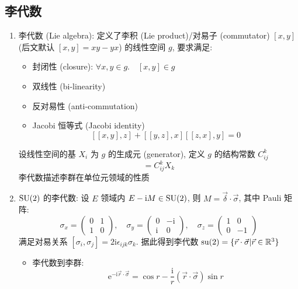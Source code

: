 \documentclass[12pt,a4paper]{article}%
\numberwithin{equation}{section}%
\newcommand\mi{\mathrm{i}}
\newcommand\e{\mathrm{e}}%
\begin{document}
\subsection{李代数} %
\label{sub:lie_alg}
\begin{enumerate}
	\item 李代数 (Lie algebra): 定义了李积 (Lie product)/对易子 (commutator) $[x,y]$ (后文默认 $[x,y] = xy-yx$) 的线性空间 $g$, 要求满足:
	\begin{itemize}
		\item 封闭性 (closure): $\forall x,y\in g.\quad [x,y]\in g$
		\item 双线性 (bi-linearity)
		\item 反对易性 (anti-commutation)
		\item Jacobi 恒等式 (Jacobi identity)
		\begin{equation}
			\left[[x,y],z\right] + \left[[y,z],x\right] \left[[z,x],y\right] = 0
		\end{equation}
	\end{itemize}
	设线性空间的基 $X_i$ 为 $g$ 的生成元 (generator), 定义 $g$ 的结构常数 $C_{ij}^k$
	\begin{equation}
		[X_i, X_j] = C_{ij}^kX_k
	\end{equation}
	李代数描述李群在单位元领域的性质
	\item $\mathrm{SU}(2)$ 的李代数: 设 $E$ 领域内 $E - \mi M \in \Group{SU}(2)$, 则 $M = \vec\delta\cdot\vec\sigma$, 其中 Pauli 矩阵:
	\begin{equation}
		\sigma_x = \begin{pmatrix}
			0 & 1 \\
			1 & 0
		\end{pmatrix},\quad
		\sigma_y = \begin{pmatrix}
			0 & -\mi \\
			\mi & 0
		\end{pmatrix},\quad
		\sigma_z = \begin{pmatrix}
			1 & 0\\
			0 & -1
		\end{pmatrix}
	\end{equation}
	满足对易关系 $[\sigma_i, \sigma_j] = 2\mi\epsilon_{ijk}\sigma_k$. 据此得到李代数  $\mathrm{su}(2) = \{\vec r\cdot\vec\sigma|\vec r\in\mathbb R^3\}$
	\begin{itemize}
		\item 李代数到李群: 
		\begin{equation}
			\e^{-\mi\vec r\cdot\vec\sigma} = \cos r - \frac{\mi}r \left(\vec r\cdot\vec\sigma\right) \sin r

\end{equation}
\end{itemize}
\end{enumerate}
\end{document}
